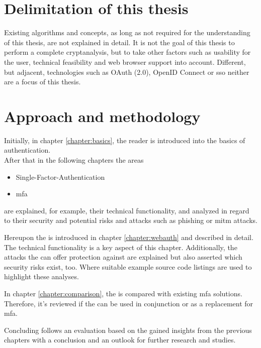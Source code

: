 \section{Delimitation of this thesis}

Existing algorithms and concepts, as long as not required for the understanding of this thesis, are not explained in detail. It is not the goal of this thesis to perform a complete cryptanalysis, but to take other factors such as usability for the user, technical feasibility and web browser support into account. Different, but adjacent, technologies such as OAuth (2.0), OpenID Connect or \gls{sso} neither are a focus of this thesis.

\section{Approach and methodology}

Initially, in chapter \ref{chapter:basics}, the reader is introduced into the basics of authentication.\\
After that in the following chapters the areas

\begin{itemize}
	\item Single-Factor-Authentication
	\item \gls{mfa}
\end{itemize}

are explained, for example, their technical functionality, and analyzed in regard to their security and potential risks and attacks such as phishing or \gls{mitm} attacks.

Hereupon the \wa{} is introduced in chapter \ref{chapter:webauth} and described in detail. The technical functionality is a key aspect of this chapter. Additionally, the attacks the \wa{} can offer protection against are explained but also asserted which security risks exist, too. Where suitable example source code listings are used to highlight these analyses.%

In chapter \ref{chapter:comparison}, the \wa{} is compared with existing \gls{mfa} solutions. Therefore, it's reviewed if the \wa{} can be used in conjunction or as a replacement for \gls{mfa}.

Concluding follows an evaluation based on the gained insights from the previous chapters with a conclusion and an outlook for further research and studies.
